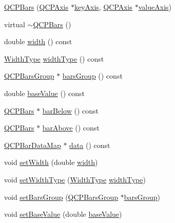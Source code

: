 \begin{DoxyCompactItemize}
\item 
\hyperlink{classQCPBars_a64006999ad9dff308f40df41cef176ad}{Q\+C\+P\+Bars} (\hyperlink{classQCPAxis}{Q\+C\+P\+Axis} $\ast$\hyperlink{classQCPAbstractPlottable_a72c7a09c22963f2c943f07112b311103}{key\+Axis}, \hyperlink{classQCPAxis}{Q\+C\+P\+Axis} $\ast$\hyperlink{classQCPAbstractPlottable_a3106f9d34d330a6097a8ec5905e5b519}{value\+Axis})
\item 
virtual \hyperlink{classQCPBars_a4d880e28031ef120603f543379be2f22}{$\sim$\+Q\+C\+P\+Bars} ()
\item 
double \hyperlink{classQCPBars_a42798c38abd5f5db22bd45d77f429625}{width} () const 
\item 
\hyperlink{classQCPBars_a65dbbf1ab41cbe993d71521096ed4649}{Width\+Type} \hyperlink{classQCPBars_a8606651ada5804075f6affd04c88dd05}{width\+Type} () const 
\item 
\hyperlink{classQCPBarsGroup}{Q\+C\+P\+Bars\+Group} $\ast$ \hyperlink{classQCPBars_a6d6b2b17619a0ba9c7a88bb2b90fc178}{bars\+Group} () const 
\item 
double \hyperlink{classQCPBars_a3c8686a74396883fd1da87b2e325b043}{base\+Value} () const 
\item 
\hyperlink{classQCPBars}{Q\+C\+P\+Bars} $\ast$ \hyperlink{classQCPBars_a2c46a686cbad95f180ca3c2e88263961}{bar\+Below} () const 
\item 
\hyperlink{classQCPBars}{Q\+C\+P\+Bars} $\ast$ \hyperlink{classQCPBars_a9ca48a6577586825d85bdc1fbf410803}{bar\+Above} () const 
\item 
\hyperlink{qcustomplot_8h_aa846c77472cae93def9f1609d0c57191}{Q\+C\+P\+Bar\+Data\+Map} $\ast$ \hyperlink{classQCPBars_ac05c21de37f677545d06fd852ef8a743}{data} () const 
\item 
void \hyperlink{classQCPBars_afec6116579d44d5b706e0fa5e5332507}{set\+Width} (double \hyperlink{classQCPBars_a42798c38abd5f5db22bd45d77f429625}{width})
\item 
void \hyperlink{classQCPBars_adcaa3b41281bb2c0f7949b341592fcc0}{set\+Width\+Type} (\hyperlink{classQCPBars_a65dbbf1ab41cbe993d71521096ed4649}{Width\+Type} \hyperlink{classQCPBars_a8606651ada5804075f6affd04c88dd05}{width\+Type})
\item 
void \hyperlink{classQCPBars_aedd1709061f0b307c47ddb45e172ef9a}{set\+Bars\+Group} (\hyperlink{classQCPBarsGroup}{Q\+C\+P\+Bars\+Group} $\ast$\hyperlink{classQCPBars_a6d6b2b17619a0ba9c7a88bb2b90fc178}{bars\+Group})
\item 
void \hyperlink{classQCPBars_a574ec7eb7537566df1a28ff085d75623}{set\+Base\+Value} (double \hyperlink{classQCPBars_a3c8686a74396883fd1da87b2e325b043}{base\+Value})

\end{DoxyCompactItemize}
